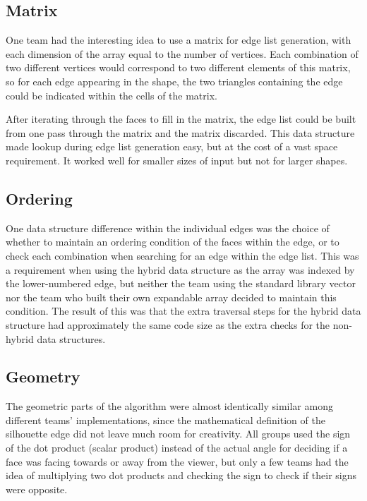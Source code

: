\documentclass[10pt,twocolumn]{article}
\begin{document}
\subsection{Matrix}
One team had the interesting idea to use a matrix for edge list generation, with each dimension of the array equal to the number of vertices.  Each combination of two different vertices would correspond to two different elements of this matrix, so for each edge appearing in the shape, the two triangles containing the edge could be indicated within the cells of the matrix.  

After iterating through the faces to fill in the matrix, the edge list could be built from one pass through the matrix and the matrix discarded.  This data structure made lookup during edge list generation easy, but at the cost of a vast space requirement.  It worked well for smaller sizes of input but not for larger shapes.  

\subsection{Ordering}
One data structure difference within the individual edges was the choice of whether to maintain an ordering condition of the faces within the edge, or to check each combination when searching for an edge within the edge list.  This was a requirement when using the hybrid data structure as the array was indexed by the lower-numbered edge, but neither the team using the standard library vector nor the team who built their own expandable array decided to maintain this condition.  The result of this was that the extra traversal steps for the hybrid data structure had approximately the same code size as the extra checks for the non-hybrid data structures.  

\subsection{Geometry}
The geometric parts of the algorithm were almost identically similar among different teams' implementations, since the mathematical definition of the silhouette edge did not leave much room for creativity.  All groups used the sign of the dot product (scalar product) instead of the actual angle for deciding if a face was facing towards or away from the viewer, but only a few teams had the idea of multiplying two dot products and checking the sign to check if their signs were opposite.  
\end{document}
